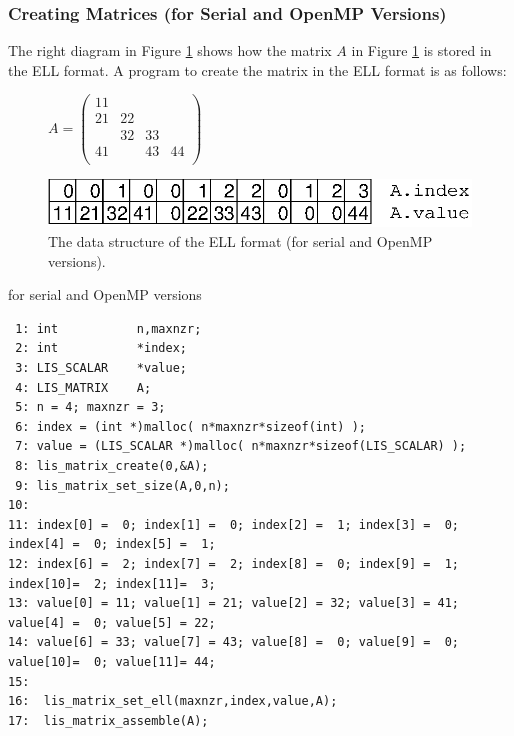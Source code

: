 \documentclass[a4paper]{article}
\begin{document}
\subsubsection{Creating Matrices (for Serial and OpenMP Versions)}
The right diagram in Figure \ref{fig:storage05} shows how the matrix $A$ in Figure \ref{fig:storage05} is stored in the ELL format. A program to create the matrix in the ELL format is as follows:
\begin{figure}[h]
{\centering 
\begin{minipage}{0.3\textwidth}
\begin{flushright}
$ 
A = \left(
\begin{array}{cccc}
11 &    &    &    \\
21 & 22 &    &    \\
   & 32 & 33 &    \\
41 &    & 43 & 44 \\
\end{array}\right)
$
\end{flushright}
\end{minipage}
\begin{minipage}{0.6\textwidth}
\begin{flushleft}
\includegraphics{storage05.eps} 
\end{flushleft}
\end{minipage}
\caption{The data structure of the ELL format (for serial and OpenMP versions).}\label{fig:storage05}}
\end{figure}
\begin{itembox}[l]{for serial and OpenMP versions}
\small
\begin{verbatim}
 1: int           n,maxnzr;
 2: int           *index;
 3: LIS_SCALAR    *value;
 4: LIS_MATRIX    A;
 5: n = 4; maxnzr = 3;
 6: index = (int *)malloc( n*maxnzr*sizeof(int) );
 7: value = (LIS_SCALAR *)malloc( n*maxnzr*sizeof(LIS_SCALAR) );
 8: lis_matrix_create(0,&A);
 9: lis_matrix_set_size(A,0,n);
10:
11: index[0] =  0; index[1] =  0; index[2] =  1; index[3] =  0; index[4] =  0; index[5] =  1;
12: index[6] =  2; index[7] =  2; index[8] =  0; index[9] =  1; index[10]=  2; index[11]=  3;
13: value[0] = 11; value[1] = 21; value[2] = 32; value[3] = 41; value[4] =  0; value[5] = 22;
14: value[6] = 33; value[7] = 43; value[8] =  0; value[9] =  0; value[10]=  0; value[11]= 44;
15:
16:  lis_matrix_set_ell(maxnzr,index,value,A);
17:  lis_matrix_assemble(A);
\end{verbatim}
\end{itembox}
\newpage
\end{document}
